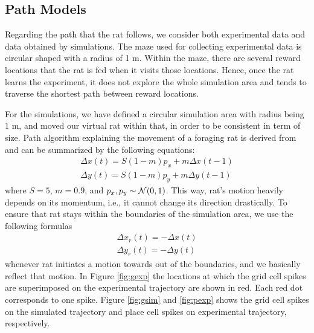 \documentclass[11pt, letterpaper, onecolumn]{article}
\newcommand{\Nc}{{\cal N}}
\begin{document}
\subsection{Path Models}
Regarding the path that the rat follows, we consider both experimental data and data obtained by simulations. The maze used for collecting experimental data is circular shaped with a radius of 1 m. Within the maze, there are several reward locations that the rat is fed when it visits those locations. Hence, once the rat learns the experiment, it does not explore the whole simulation area and tends to traverse the shortest path between reward locations.

For the simulations, we have defined a circular simulation area with radius being 1 m, and moved our virtual rat within that, in order to be consistent in term of size. Path algorithm explaining the movement of a foraging rat is derived from \cite{Hasselmo:Grid07} and can be summarized by the following equations:
\begin{equation}
\begin{array}{cc}
\Delta x(t) = S(1-m)p_{x} + m\Delta x(t-1)\\
\Delta y(t) = S(1-m)p_{y} + m\Delta y(t-1)
\end{array}
\end{equation}
where $ S = 5 $, $ m = 0.9 $, and $ p_{x}, p_{y} \sim \Nc(0,1) $. This  way, rat's motion heavily depends on its momentum, i.e., it cannot change its direction drastically. To ensure that rat stays within  the boundaries of the simulation area, we use the following formulas
\begin{equation}
\begin{array}{cc}
\Delta x_{r}(t) = - \Delta x(t)\\
\Delta y_{r}(t) = - \Delta y(t)
\end{array}
\end{equation}
whenever rat initiates a motion towards out of the boundaries, and we basically reflect that motion. In Figure \ref{fig:gexp} the locations at which the grid cell spikes are superimposed on the experimental trajectory are shown in red. Each red dot corresponds to one spike. Figure \ref{fig:gsim} and \ref{fig:pexp} shows the grid cell spikes on the simulated trajectory and place cell spikes on experimental trajectory, respectively.
\end{document}
